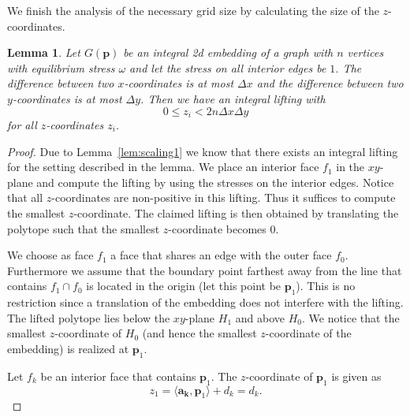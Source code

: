 \documentclass{article}
\theoremstyle{plain} \newtheorem{thm}{Theorem}[section]
\newtheorem{lem}{Lemma}[section]
\newcommand{\p}{\mathbf{p}}
\begin{document}
We finish the analysis of the necessary grid size by calculating the 
size of the $z$-coordinates. 
\begin{lem}\label{lem:zsize}
Let $G(\p)$ be an integral 2d embedding of a graph with $n$ vertices
with equilibrium stress $\omega$ and let the
stress on all interior edges be $1$. The difference between two $x$-coordinates is at most
$\Delta x$ and the difference between two $y$-coordinates is at most $\Delta y$. Then we have an integral lifting with
\[0\leq z_i < 2n\Delta x \Delta y \]
for all $z$-coordinates $z_i$.
\end{lem}
\begin{proof}
Due to Lemma~\ref{lem:scaling1} we know that there exists an integral 
lifting for the setting described in the lemma.  We place an interior 
face $f_1$ in the $xy$-plane and compute the lifting by using the stresses on
the interior edges. 
Notice that all $z$-coordinates
are non-positive in this lifting. Thus it suffices to compute the smallest
$z$-coordinate. The claimed lifting is then obtained by translating the polytope such that the smallest
$z$-coordinate becomes 0.


We choose as face $f_1$ a face that shares an edge with
the outer face $f_0$. Furthermore we assume that the boundary point
farthest away from the line that contains $f_1\cap f_0$ is located in
the origin (let this point be $\p_1$). 
This is no restriction since a translation of the 
embedding does not interfere with the lifting. The lifted 
polytope lies below the $xy$-plane $H_{1}$ and above  $H_0$.
We notice that the smallest $z$-coordinate of $H_{0}$ (and hence the smallest $z$-coordinate of the embedding) is realized at $\p_1$.

Let $f_k$ be an interior face that contains $\p_1$. The
$z$-coordinate of $\p_1$ is given as 
\[z_1=\langle \mathbf{a_k},\p_1 \rangle + d_k = d_k.\]


\end{proof}
\end{document}
